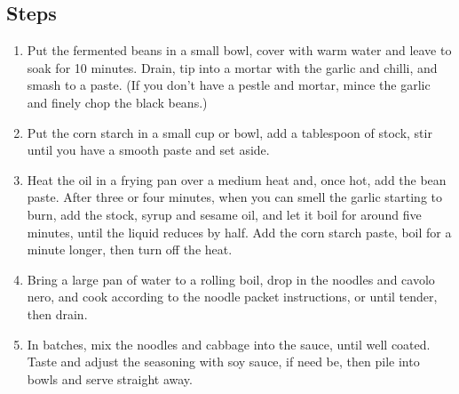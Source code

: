 \documentclass{book}
\begin{document}
\subsection*{Steps}
\begin{enumerate}
\item Put the fermented beans in a small bowl, cover with warm water and leave to soak for 10 minutes. Drain, tip into a mortar with the garlic and chilli, and smash to a paste. (If you don’t have a pestle and mortar, mince the garlic and finely chop the black beans.)
\item Put the corn starch in a small cup or bowl, add a tablespoon of stock, stir until you have a smooth paste and set aside.
\item Heat the oil in a frying pan over a medium heat and, once hot, add the bean paste. After three or four minutes, when you can smell the garlic starting to burn, add the stock, syrup and sesame oil, and let it boil for around five minutes, until the liquid reduces by half. Add the corn starch paste, boil for a minute longer, then turn off the heat.
\item Bring a large pan of water to a rolling boil, drop in the noodles and cavolo nero, and cook according to the noodle packet instructions, or until tender, then drain.
\item In batches, mix the noodles and cabbage into the sauce, until well coated. Taste and adjust the seasoning with soy sauce, if need be, then pile into bowls and serve straight away.
\end{enumerate}
\newpage
\end{document}
